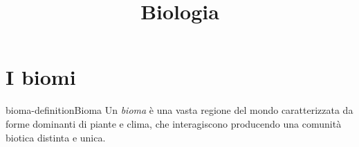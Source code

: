 \documentclass[preview]{standalone}
\begin{document}
\title{Biologia}
\genpage

\section{I biomi}

\begin{snippetdefinition}{bioma-definition}{Bioma}
    Un \textit{bioma} è una vasta regione del mondo caratterizzata da forme dominanti
    di piante e clima, che interagiscono producendo una comunità biotica distinta e unica.
\end{snippetdefinition}



\end{document}
